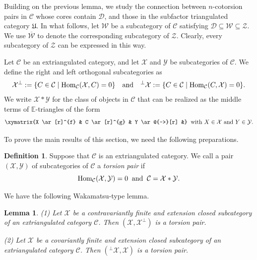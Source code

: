 \documentclass[a4paper,reqno,11pt]{amsart}
\newcommand{\cal}{\mathcal}
\newtheorem{lemma}[theorem]{Lemma}
\theoremstyle{definition}
\newtheorem{definition}[theorem]{Definition}
\def\C{\mathcal{C}}
\def\D{\mathcal{D}}
\def\W{\mathscr{W}}
\def\X{\mathcal{X}}
\def\D{\mathcal{D}}
\def\Y{\mathcal{Y}}
\def\Z{\mathcal {Z}}
\def \text{\mbox}
\providecommand{\Hom}{\mathop{\rm Hom}\nolimits}%
\begin{document}
Building on the previous lemma, we study the connection between $n$-cotorsion pairs in $\C$ whose cores contain $\D$, and those in the subfactor triangulated category $\mathfrak{U}$. In what follows, let $\W$ be a subcategory of $\C$ satisfying $\D \subseteq \W \subseteq \Z$. We use $\overline{\W}$ to denote the corresponding subcategory of $\Z$. Clearly, every subcategory of $\Z$ can be expressed in this way.

Let $\C$ be an extriangulated category, and let $\X$ and $\Y$ be subcategories of $\C$. We define the right and left orthogonal subcategories as
\[
\X^\perp := \{ C \in \C \mid \Hom_\C(\X, C) = 0 \} \quad \text{and} \quad {}^\perp\X := \{ C \in \C \mid \Hom_\C(C, \X) = 0 \}.
\]
We write $\X \ast \Y$ for the class of objects in $\C$ that can be realized as the middle terms of $\mathbb{E}$-triangles of the form
\[
\xymatrix{X \ar[r]^{f} & C \ar[r]^{g} & Y \ar@{-->}[r] &}\;\; \text{with } X \in \X \text{ and } Y \in \Y.
\]

To prove the main results of this section, we need the following preparations.








\begin{definition}
Suppose that $\C$ is an extriangulated category. We call a pair $(\X,\Y)$ of subcategories of $\C$ a \emph{torsion} \emph{pair} if
$$\Hom_\C(\X,\Y)=0\;\;\text{and}\;\;\C=\X\ast\Y.$$
\end{definition}

We have the following Wakamatsu-type lemma.

\begin{lemma}\label{h}
\emph{(1)} Let $\cal X$ be a contravariantly finite and extension closed subcategory of an extriangulated category $\C$. Then $(\cal X,\cal X^\bot)$ is a torsion pair.

\emph{(2)} Let $\cal X$ be a covariantly finite and extension closed subcategory of an extriangulated category $\C$. Then  $(^\bot{\cal X},\cal X)$ is a torsion pair.
\end{lemma}
\end{document}
